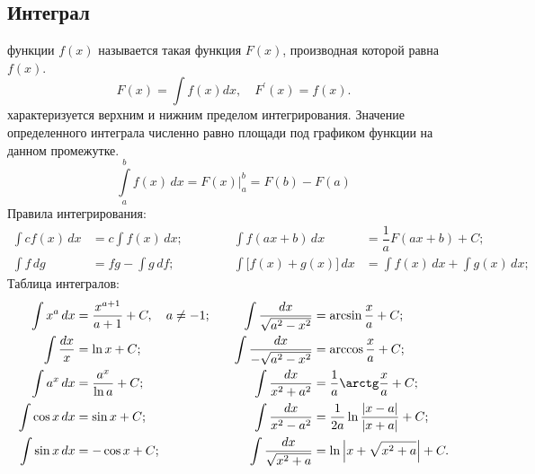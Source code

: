 \subsection{Интеграл}
 функции $f(x)$ называется такая функция $F(x)$, производная которой равна $f(x)$.
\begin{equation}
	F(x) = \int f(x)dx,\quad F^\prime(x)=f(x).
\end{equation}
 характеризуется верхним и нижним пределом интегрирования. Значение определенного интеграла численно равно площади под графиком функции на данном промежутке.
\begin{equation}
	\int\limits^b_a f(x)\,dx = F(x) \biggr|^b_a = F(b) - F(a)
\end{equation}
Правила интегрирования:
\begin{align*}
	\int c f(x) \,dx &= c \int f(x) \,dx;  &&&&&\int f(ax + b) \,dx &= \dfrac{1}{a}F(ax + b) + C;\\
	\int f \,dg &= fg - \int g \,df; &&&&& \int \bigl[f(x) + g(x)\bigr] \,dx &= \int f(x) \,dx + \int g(x) \,dx;
\end{align*}
Таблица интегралов:
\begin{align*}
	\int  x^a \,dx &= \dfrac{x^{a+1}}{a+1} + C,\quad a \neq -1;\quad &
	\int \dfrac{dx}{\sqrt{a^2 - x^2}} &= \arcsin\dfrac{x}{a} + C;\\
	\int \frac{dx}{x} &= \ln x + C; &
	\int \dfrac{dx}{-\sqrt{a^2 - x^2}} &= \arccos\dfrac{x}{a} + C;\\
	\int a^x \,dx &= \dfrac{a^x}{\ln a} + C; &
	\int \dfrac{dx}{x^2 + a^2} &= \dfrac{1}{a} \arctg \dfrac{x}{a} + C; \\
	\int \cos x \,dx &= \sin x + C; &
	\int \dfrac{dx}{x^2 - a^2} &= \dfrac{1}{2a} \ln \dfrac{|x - a|}{|x + a|} + C;\\
	\int \sin x \,dx &= -\cos x + C; &
	\int \dfrac{dx}{\sqrt{x^2 + a}} &= \ln \left| x + \sqrt{x^2 + a} \right| + C.
\end{align*}
